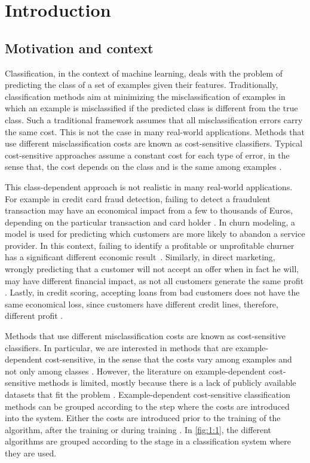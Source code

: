\chapter{Introduction}\label{ch:1}

\section{Motivation and context}

  Classification, in the context of machine learning, deals with the problem of 
  predicting the class of a set of examples given their features. Traditionally, classification 
  methods aim at minimizing the misclassification of examples in which an example is 
  misclassified if the predicted class is different from the true class. Such a traditional 
  framework assumes that all misclassification errors carry the same cost. This is not the case in 
  many real-world applications. Methods that use different misclassification costs are known as 
  cost-sensitive classifiers. Typical cost-sensitive approaches assume a constant cost for each 
  type of error, in the sense that, the cost depends on the class and is the same among examples 
  \citep{Elkan2001,Kim2012}. 
  
  This class-dependent approach is not realistic in many real-world applications. For 
  example in credit card fraud detection, failing to detect a fraudulent transaction may have an 
  economical impact from a few to thousands of Euros, depending on the particular transaction and 
  card holder \citep{Ngai2011a}. In churn modeling, a model is used for predicting which
  customers are more likely to abandon a service provider. In this context, failing to identify a 
  profitable or unprofitable churner has a significant different economic 
  result~\citep{Verbraken2013}. Similarly, in direct marketing, wrongly predicting that a customer 
  will not accept an offer when in fact he will, may have different financial impact, as not all 
  customers generate the same profit \citep{Zadrozny2003}. Lastly, in credit scoring, accepting 
  loans from bad customers does not have the same economical loss, since customers have different 
  credit lines, therefore, different profit \citep{Verbraken2014}.
  
  Methods that use different misclassification costs are known as cost-sensitive classifiers. In 
  particular, we are interested in methods that are example-dependent cost-sensitive, in the sense 
  that the costs vary among examples and not only among classes \citep{Elkan2001}. However, the 
  literature on example-dependent cost-sensitive methods is limited, mostly because there is a 
  lack of publicly available datasets that fit the problem \citep{MacAodha2013}.
  Example-dependent cost-sensitive classification methods can be grouped according to the step 
  where the costs are introduced into the system. Either the costs are introduced prior to the 
  training of the algorithm, after the training or during training \citep{Wang2013}. In 
  \figurename{ \ref{fig:1:1}}, the different algorithms are grouped according to the stage in a 
  classification system where they are used.
  
